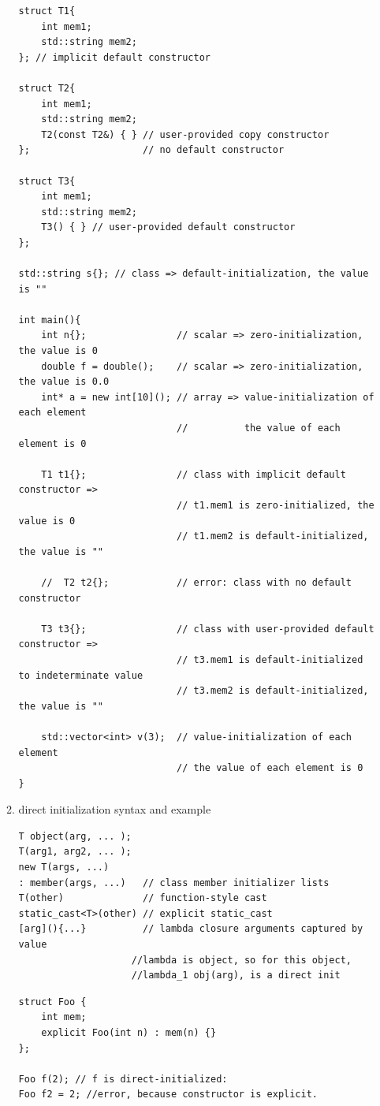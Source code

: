 \documentclass[a4paper,11pt,twoside]{book}
\begin{document}
\begin{itemize}
\begin{enumerate}
\begin{lstlisting}
struct T1{
	int mem1;
	std::string mem2;
}; // implicit default constructor

struct T2{
	int mem1;
	std::string mem2;
	T2(const T2&) { } // user-provided copy constructor
};                    // no default constructor

struct T3{
	int mem1;
	std::string mem2;
	T3() { } // user-provided default constructor
};

std::string s{}; // class => default-initialization, the value is ""

int main(){
	int n{};                // scalar => zero-initialization, the value is 0
	double f = double();    // scalar => zero-initialization, the value is 0.0
	int* a = new int[10](); // array => value-initialization of each element
							//          the value of each element is 0
							
	T1 t1{};                // class with implicit default constructor =>
							// t1.mem1 is zero-initialized, the value is 0
							// t1.mem2 is default-initialized, the value is ""
							
	//  T2 t2{};            // error: class with no default constructor
	
	T3 t3{};                // class with user-provided default constructor =>
							// t3.mem1 is default-initialized to indeterminate value
							// t3.mem2 is default-initialized, the value is ""
							
	std::vector<int> v(3);  // value-initialization of each element
							// the value of each element is 0
}
\end{lstlisting}


		\item direct initialization syntax and example
\begin{lstlisting}[numbers=none]
T object(arg, ... );
T(arg1, arg2, ... );
new T(args, ...)
: member(args, ...)   // class member initializer lists
T(other)              // function-style cast
static_cast<T>(other) // explicit static_cast
[arg](){...}          // lambda closure arguments captured by value
					//lambda is object, so for this object, 
					//lambda_1 obj(arg), is a direct init
\end{lstlisting}



\begin{lstlisting}[numbers=none]
struct Foo {
	int mem;
	explicit Foo(int n) : mem(n) {}
};

Foo f(2); // f is direct-initialized:
Foo f2 = 2; //error, because constructor is explicit.
\end{lstlisting}



\end{enumerate}
\end{itemize}
\end{document}
